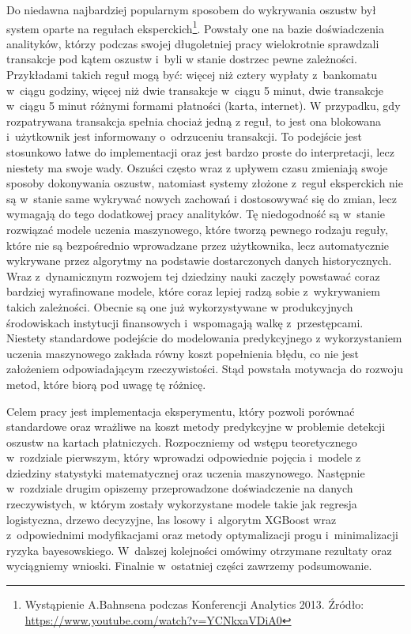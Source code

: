\documentclass[inzynierska]{pwr_wmat_praca_dyplomowa}
\theoremstyle{plain}
\numberwithin{theorem}{chapter}
\theoremstyle{definition}
\numberwithin{theorem}{chapter}
\begin{document}
Do niedawna najbardziej popularnym sposobem do wykrywania oszustw był system oparte na regułach eksperckich\footnote{Wystąpienie A.Bahnsena podczas Konferencji Analytics 2013. Źródło: \url{https://www.youtube.com/watch?v=YCNkxaVDiA0}}. Powstały one na bazie doświadczenia analityków, którzy podczas swojej długoletniej pracy wielokrotnie sprawdzali transakcje pod kątem oszustw i~byli w stanie dostrzec pewne zależności. Przykładami takich reguł mogą być: więcej niż cztery wypłaty z~bankomatu w~ciągu godziny, więcej niż dwie transakcje w~ciągu 5 minut, dwie transakcje w~ciągu 5 minut różnymi formami płatności (karta, internet). W przypadku, gdy rozpatrywana transakcja spełnia chociaż jedną z reguł, to jest ona blokowana i~użytkownik jest informowany o~odrzuceniu transakcji. To podejście jest stosunkowo łatwe do implementacji oraz jest bardzo proste do interpretacji, lecz niestety ma swoje wady. Oszuści często wraz z upływem czasu zmieniają swoje sposoby dokonywania oszustw, natomiast systemy złożone z~reguł eksperckich nie są w~stanie same wykrywać nowych zachowań i dostosowywać się do zmian, lecz wymagają do tego dodatkowej pracy analityków. Tę niedogodność są w~stanie rozwiązać modele uczenia maszynowego, które tworzą pewnego rodzaju reguły, które nie są bezpośrednio wprowadzane przez użytkownika, lecz automatycznie wykrywane przez algorytmy na podstawie dostarczonych danych historycznych. Wraz z~dynamicznym rozwojem tej dziedziny nauki zaczęły powstawać coraz bardziej wyrafinowane modele, które coraz lepiej radzą sobie z~wykrywaniem takich zależności. Obecnie są one już wykorzystywane w produkcyjnych środowiskach instytucji finansowych i~wspomagają walkę z~przestępcami. Niestety standardowe podejście do modelowania predykcyjnego z wykorzystaniem uczenia maszynowego zakłada równy koszt popełnienia błędu, co nie jest założeniem odpowiadającym rzeczywistości. Stąd powstała motywacja do rozwoju metod, które biorą pod uwagę tę różnicę.

Celem pracy jest implementacja eksperymentu, który pozwoli porównać standardowe oraz wrażliwe na koszt metody predykcyjne w problemie detekcji oszustw na kartach płatniczych. Rozpoczniemy od wstępu teoretycznego w~rozdziale pierwszym, który wprowadzi odpowiednie pojęcia i~modele z dziedziny statystyki matematycznej oraz uczenia maszynowego. Następnie w~rozdziale drugim opiszemy przeprowadzone doświadczenie na danych rzeczywistych, w którym zostały wykorzystane modele takie jak regresja logistyczna, drzewo decyzyjne, las losowy i~algorytm XGBoost wraz z~odpowiednimi modyfikacjami oraz metody optymalizacji progu i~minimalizacji ryzyka bayesowskiego. W~dalszej kolejności omówimy otrzymane rezultaty oraz wyciągniemy wnioski. Finalnie w~ostatniej części zawrzemy podsumowanie.
\end{document}
